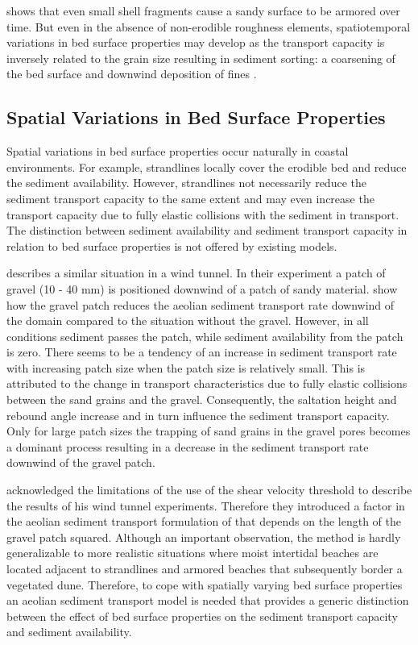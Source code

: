 \citet{McKennaNeuman2012} shows that even small shell fragments cause
a sandy surface to be armored over time. But even in the absence of
non-erodible roughness elements, spatiotemporal variations in bed
surface properties may develop as the transport capacity is inversely
related to the grain size \citep{Bagnold1937a} resulting in sediment
sorting: a coarsening of the bed surface and downwind deposition of
fines \citep{Bagnold1937a, VanDerWal2000, Arens2002}.

\subsection{Spatial Variations in Bed Surface Properties}

Spatial variations in bed surface properties occur naturally in
coastal environments. For example, strandlines locally cover the
erodible bed and reduce the sediment availability. However,
strandlines not necessarily reduce the sediment transport capacity to
the same extent and may even increase the transport capacity due to
fully elastic collisions with the sediment in transport. The
distinction between sediment availability and sediment transport
capacity in relation to bed surface properties is not offered by
existing models.

\citet{Dong2004b} describes a similar situation in a wind tunnel. In
their experiment a patch of gravel (10 - 40 mm) is positioned downwind
of a patch of sandy material. \citet{Dong2004b} show how the gravel
patch reduces the aeolian sediment transport rate downwind of the
domain compared to the situation without the gravel. However, in all
conditions sediment passes the patch, while sediment availability from
the patch is zero. There seems to be a tendency of an increase in
sediment transport rate with increasing patch size when the patch size
is relatively small. This is attributed to the change in transport
characteristics due to fully elastic collisions between the sand
grains and the gravel. Consequently, the saltation height and rebound
angle increase and in turn influence the sediment transport
capacity. Only for large patch sizes the trapping of sand grains in
the gravel pores becomes a dominant process resulting in a decrease in
the sediment transport rate downwind of the gravel patch.

\citet{Dong2004b} acknowledged the limitations of the use of the shear
velocity threshold to describe the results of his wind tunnel
experiments. Therefore they introduced a factor in the aeolian
sediment transport formulation of \citet{Dymin1954}
that depends on the length of the
gravel patch squared. Although an important observation, the method is
hardly generalizable to more realistic situations where moist
intertidal beaches are located adjacent to strandlines and armored
beaches that subsequently border a vegetated dune. Therefore, to cope
with spatially varying bed surface properties an aeolian sediment
transport model is needed that provides a generic distinction between
the effect of bed surface properties on the sediment transport
capacity and sediment availability.

